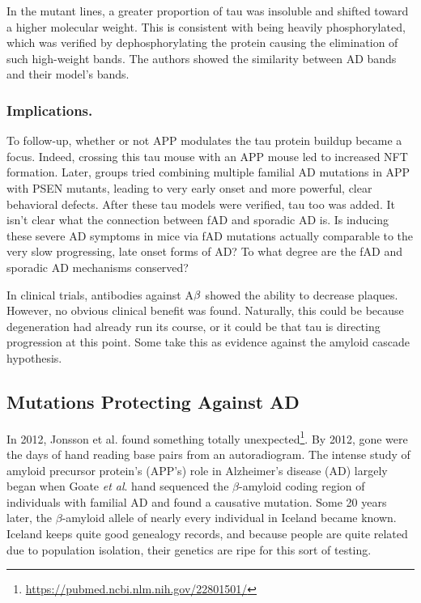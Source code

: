 In the mutant lines, a greater proportion of tau was insoluble and shifted toward a higher molecular weight. This is consistent with being heavily phosphorylated, which was verified by dephosphorylating the protein causing the elimination of such high-weight bands. The authors showed the similarity between AD bands and their model's bands. 

\subsubsection*{Implications.}

To follow-up, whether or not APP modulates the tau protein buildup became a focus. Indeed, crossing this tau mouse with an APP mouse led to increased NFT formation. Later, groups tried combining multiple familial AD mutations in APP with PSEN mutants, leading to very early onset and more powerful, clear behavioral defects. After these tau models were verified, tau too was added. It isn't clear what the connection between fAD and sporadic AD is. Is inducing these severe AD symptoms in mice via fAD mutations actually comparable to the very slow progressing, late onset forms of AD? To what degree are the fAD and sporadic AD mechanisms conserved?\newline

In clinical trials, antibodies against A$\beta$ showed the ability to decrease plaques. However, no obvious clinical benefit was found. Naturally, this could be because degeneration had already run its course, or it could be that tau is directing progression at this point. Some take this as evidence against the amyloid cascade hypothesis. 


\subsection*{Mutations Protecting Against AD}

 In 2012, Jonsson et al. found something totally unexpected\footnote{\url{https://pubmed.ncbi.nlm.nih.gov/22801501/}}. By 2012, gone were the days of hand reading base pairs from an autoradiogram. The intense study of amyloid precursor protein's (APP's) role in Alzheimer's disease (AD) largely began when Goate \textit{et al}. hand sequenced the $\beta$-amyloid coding region of individuals with familial AD and found a causative mutation. Some 20 years later, the $\beta$-amyloid allele of nearly every individual in Iceland became known. Iceland keeps quite good genealogy records, and because people are quite related due to population isolation, their genetics are ripe for this sort of testing.\newline

